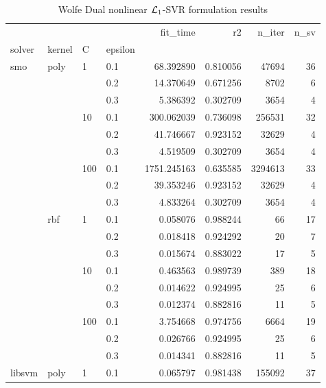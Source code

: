\begin{table}[H]
\centering
\caption{Wolfe Dual nonlinear $\protect \mathcal{L}_1$-SVR formulation results}
\label{nonlinear_dual_l1_svr_cv_results}
\begin{tabular}{llllrrrr}
\toprule
       &     &     &     &     fit\_time &        r2 &    n\_iter &  n\_sv \\
solver & kernel & C & epsilon &              &           &           &       \\
\midrule
smo & poly & 1   & 0.1 &    68.392890 &  0.810056 &     47694 &    36 \\
       &     &     & 0.2 &    14.370649 &  0.671256 &      8702 &     6 \\
       &     &     & 0.3 &     5.386392 &  0.302709 &      3654 &     4 \\
       &     & 10  & 0.1 &   300.062039 &  0.736098 &    256531 &    32 \\
       &     &     & 0.2 &    41.746667 &  0.923152 &     32629 &     4 \\
       &     &     & 0.3 &     4.519509 &  0.302709 &      3654 &     4 \\
       &     & 100 & 0.1 &  1751.245163 &  0.635585 &   3294613 &    33 \\
       &     &     & 0.2 &    39.353246 &  0.923152 &     32629 &     4 \\
       &     &     & 0.3 &     4.833264 &  0.302709 &      3654 &     4 \\
       & rbf & 1   & 0.1 &     0.058076 &  0.988244 &        66 &    17 \\
       &     &     & 0.2 &     0.018418 &  0.924292 &        20 &     7 \\
       &     &     & 0.3 &     0.015674 &  0.883022 &        17 &     5 \\
       &     & 10  & 0.1 &     0.463563 &  0.989739 &       389 &    18 \\
       &     &     & 0.2 &     0.014622 &  0.924995 &        25 &     6 \\
       &     &     & 0.3 &     0.012374 &  0.882816 &        11 &     5 \\
       &     & 100 & 0.1 &     3.754668 &  0.974756 &      6664 &    19 \\
       &     &     & 0.2 &     0.026766 &  0.924995 &        25 &     6 \\
       &     &     & 0.3 &     0.014341 &  0.882816 &        11 &     5 \\
libsvm & poly & 1   & 0.1 &     0.065797 &  0.981438 &    155092 &    37 \\

\end{tabular}
\end{table}
